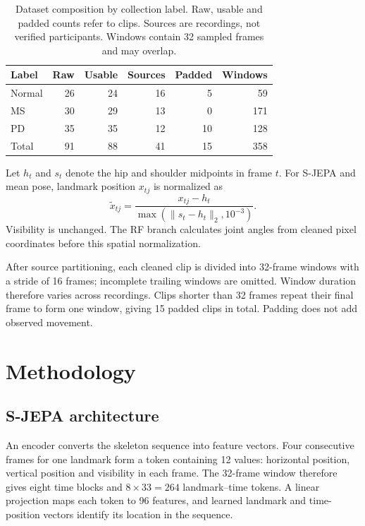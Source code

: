 \documentclass[10pt,twocolumn,letterpaper]{article}
\begin{document}
\begin{table}[t]
\centering\small
\setlength{\tabcolsep}{4pt}
\begin{tabular}{lrrrrr}
\toprule
Label & Raw & Usable & Sources & Padded & Windows\\
\midrule
Normal & 26 & 24 & 16 & 5 & 59\\
MS & 30 & 29 & 13 & 0 & 171\\
PD & 35 & 35 & 12 & 10 & 128\\
\midrule
Total & 91 & 88 & 41 & 15 & 358\\
\bottomrule
\end{tabular}
\caption{Dataset composition by collection label. Raw, usable and padded counts refer to clips. Sources are recordings, not verified participants. Windows contain 32 sampled frames and may overlap.}
\label{tab:data}
\end{table}

Let $h_t$ and $s_t$ denote the hip and shoulder midpoints in frame $t$. For S-JEPA and mean pose, landmark position $x_{tj}$ is normalized as
\begin{equation}
\widetilde{x}_{tj}=\frac{x_{tj}-h_t}{\max(\|s_t-h_t\|_2,10^{-3})}.
\label{eq:normalization}
\end{equation}
Visibility is unchanged. The RF branch calculates joint angles from cleaned pixel coordinates before this spatial normalization.

After source partitioning, each cleaned clip is divided into 32-frame windows with a stride of 16 frames; incomplete trailing windows are omitted. Window duration therefore varies across recordings. Clips shorter than 32 frames repeat their final frame to form one window, giving 15 padded clips in total. Padding does not add observed movement.

\section{Methodology}
\subsection{S-JEPA architecture}
An encoder converts the skeleton sequence into feature vectors. Four consecutive frames for one landmark form a token containing 12 values: horizontal position, vertical position and visibility in each frame. The 32-frame window therefore gives eight time blocks and $8\times33=264$ landmark--time tokens. A linear projection maps each token to 96 features, and learned landmark and time-position vectors identify its location in the sequence.
\end{document}
